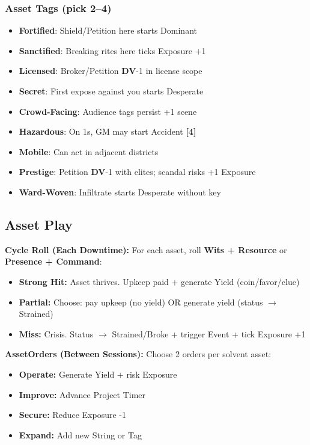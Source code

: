 \documentclass[10pt]{article}
\newcommand{\asset}{\textbf{Asset}}
\newcommand{\dv}{\textbf{DV}}
\newcommand{\timer}[1]{\textbf{[#1]}}
\newcommand{\tag}[1]{\textbf{#1}}
\begin{document}
\subsubsection{Asset Tags (pick 2--4)}
\begin{itemize}[noitemsep]
\item \tag{Fortified}: Shield/Petition here starts Dominant
\item \tag{Sanctified}: Breaking rites here ticks Exposure +1
\item \tag{Licensed}: Broker/Petition \dv -1 in license scope
\item \tag{Secret}: First expose against you starts Desperate
\item \tag{Crowd-Facing}: Audience tags persist +1 scene
\item \tag{Hazardous}: On 1s, GM may start Accident \timer{4}
\item \tag{Mobile}: Can act in adjacent districts
\item \tag{Prestige}: Petition \dv -1 with elites; scandal risks +1 Exposure
\item \tag{Ward-Woven}: Infiltrate starts Desperate without key
\end{itemize}

\subsection{Asset Play}

\textbf{Cycle Roll (Each Downtime):} For each asset, roll \textbf{Wits + Resource} or \textbf{Presence + Command}:
\begin{itemize}[noitemsep]
\item \textbf{Strong Hit:} Asset thrives. Upkeep paid + generate Yield (coin/favor/clue)
\item \textbf{Partial:} Choose: pay upkeep (no yield) OR generate yield (status $\rightarrow$ Strained)
\item \textbf{Miss:} Crisis. Status $\rightarrow$ Strained/Broke + trigger Event + tick Exposure +1
\end{itemize}

\textbf{\asset Orders (Between Sessions):} Choose 2 orders per solvent asset:
\begin{itemize}[noitemsep]
\item \textbf{Operate:} Generate Yield + risk Exposure
\item \textbf{Improve:} Advance Project Timer 
\item \textbf{Secure:} Reduce Exposure -1
\item \textbf{Expand:} Add new String or Tag
\end{itemize}
\end{document}
